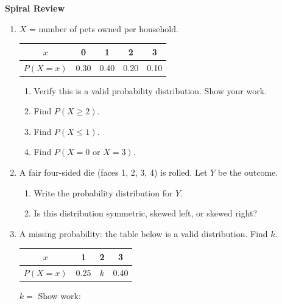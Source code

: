 \documentclass[10pt]{article}
\begin{document}
\namedateperiod

\vspace{0.2in}

{\large\bfseries\color{navy} Spiral Review}

\vspace{0.12in}

\begin{enumerate}

    \item $X$ = number of pets owned per household.
    \begin{center}
    \renewcommand{\arraystretch}{1.4}
    \begin{tabular}{@{}ccccc@{}}
    $x$ & 0 & 1 & 2 & 3 \\
    \hline
    $P(X=x)$ & 0.30 & 0.40 & 0.20 & 0.10 \\
    \end{tabular}
    \end{center}
    \begin{enumerate}[label=(\alph*), itemsep=8pt]
        \item Verify this is a valid probability distribution. Show your work.\\
              \writeline
        \item Find $P(X \ge 2)$. \quad \blank{4cm}
        \item Find $P(X \le 1)$. \quad \blank{4cm}
        \item Find $P(X = 0 \text{ or } X = 3)$. \quad \blank{4cm}
    \end{enumerate}

    \vspace{0.14in}

    \item A fair four-sided die (faces 1, 2, 3, 4) is rolled. Let $Y$ be the outcome.
    \begin{enumerate}[label=(\alph*), itemsep=8pt]
        \item Write the probability distribution for $Y$.

              \vspace{0.25in}

        \item Is this distribution symmetric, skewed left, or skewed right?
              \blank{4cm}
    \end{enumerate}

    \vspace{0.14in}

    \item A missing probability: the table below is a valid distribution. Find $k$.
    \begin{center}
    \renewcommand{\arraystretch}{1.4}
    \begin{tabular}{@{}cccc@{}}
    $x$ & 1 & 2 & 3 \\
    \hline
    $P(X=x)$ & 0.25 & $k$ & 0.40 \\
    \end{tabular}
    \end{center}
    $k = $ \blank{3cm} \quad Show work: \blank{5cm}


\end{enumerate}
\end{document}
